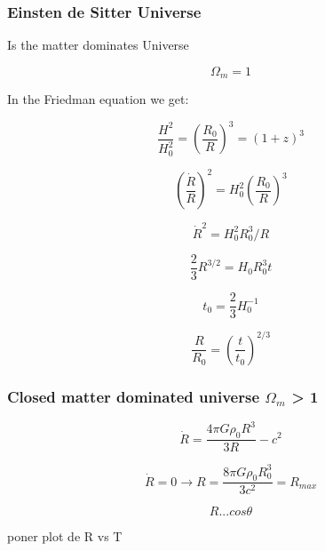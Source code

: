 \documentclass[a4paper, 12pt]{article} %
\begin{document}
\subsubsection{Einsten de Sitter Universe}

Is the matter dominates Universe

\begin{equation}
\Omega_m = 1
\end{equation}


In the  Friedman equation we get:

\begin{equation}
\dfrac{H^2}{H_0 ^2} = (\dfrac{R_0}{R})^3 = (1+z)^3
\end{equation}

\begin{equation}
(\dfrac{\dot{R}}{R})^2 = H_0^2 (\dfrac{R_0}{R})^3
\end{equation}

\begin{equation}
\dot{R}^2 = H_0^2R_0^3 / R 
\end{equation}


\begin{equation}
\dfrac{2}{3} R^{3/2} = H_0 R_0^3 t 
\end{equation}

\begin{equation}
t_0 = \dfrac{2}{3}H_0^{-1}
\end{equation}

\begin{equation}
\dfrac{R}{R_0} = (\dfrac{t}{t_0} )^{2/3}
\end{equation}

\subsubsection{Closed matter dominated universe $\Omega_m$ > 1 }

\begin{equation}
\dot{R} = \dfrac{4\pi G \rho_0 R^3}{3R} - c^2
\end{equation} 

\begin{equation}
\dot{R} = 0  \rightarrow R = \dfrac{8\pi G \rho_0 R_0^3}{3c^2} = R_{max}
\end{equation}

\begin{equation}
R ... cos \theta
\end{equation}

poner plot de R vs T 
\end{document}
